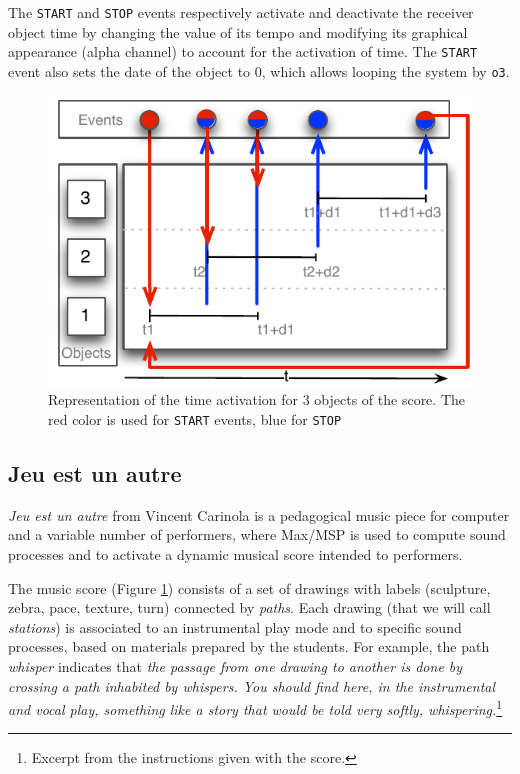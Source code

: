 \documentclass{article}
\newcommand{\OSC}[1]	{{\fontsize{8.5pt}{8pt} \selectfont\texttt{#1}}}
\begin{document}
The \OSC{START} and \OSC{STOP} events respectively activate and deactivate the receiver object time by changing the value of its tempo and modifying its graphical appearance (alpha channel) to account for the activation of time. The \OSC{START} event also sets the date of the object to 0, which allows looping the system by \OSC{o3}.
\begin{figure}[h]
   \centering
   \includegraphics[width=0.8\columnwidth]{imgs/sample}
   \caption{Representation of the time activation for 3 objects of the score. The red color is used for \OSC{START} events, blue for \OSC{STOP}}
   \label{fig:sample}
\end{figure}


\subsection{Jeu est un autre}

\emph{Jeu est un autre} from Vincent Carinola is a pedagogical music piece for computer and a variable number of performers, where Max/MSP is used to compute sound processes and to 
activate a dynamic musical score intended to performers. 

The music score (Figure \ref{fig:sample}) consists of a set of drawings with labels (sculpture, zebra, pace, texture, turn) connected by \emph{paths}. Each drawing (that we will call \emph{stations}) is associated to an instrumental play mode and to specific sound processes, based on materials prepared by the students. For example, the path \emph{whisper} indicates that \emph{the passage from one drawing to another is done by crossing a path inhabited by whispers. 
You should find here, in the instrumental and vocal play, something like a story that would be told very softly, whispering.}\footnote{Excerpt from the instructions given with the score.}
\end{document}
